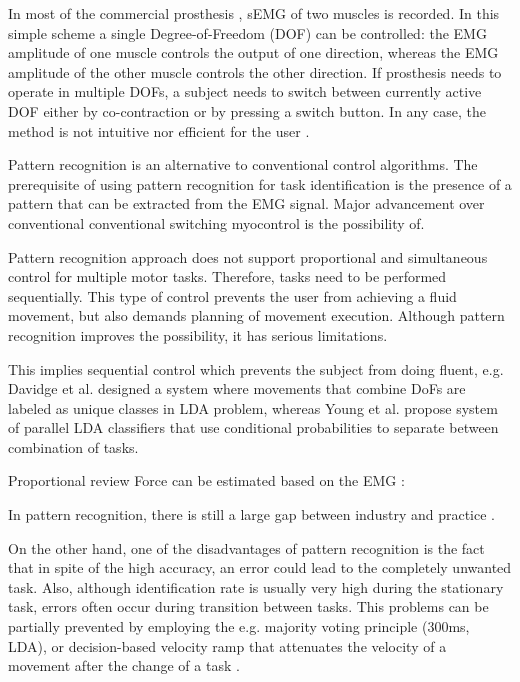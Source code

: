 In most of the commercial prosthesis \citep{Parker1986}, sEMG of two muscles is recorded. In this simple scheme a single Degree-of-Freedom (DOF) can be controlled: the EMG amplitude of one muscle controls the output of one direction, whereas the EMG amplitude of the other muscle controls the other direction. If prosthesis needs to operate in multiple DOFs, a subject needs to switch between currently active DOF either by co-contraction or by pressing a switch button. In any case, the method is not intuitive nor efficient for the user \citep{Farina2014}.

Pattern recognition is an alternative to conventional control algorithms. The prerequisite of using pattern recognition for task identification is the presence of a pattern that can be extracted from the EMG signal. Major advancement over conventional conventional switching myocontrol is the possibility of.

Pattern recognition approach does not support proportional and simultaneous control for multiple motor tasks. Therefore, tasks need to be performed sequentially. This type of control prevents the user from achieving a fluid movement, but also demands planning of movement execution. Although pattern recognition improves the possibility, it has serious limitations. 

This implies sequential control which prevents the subject from doing fluent, e.g. Davidge et al. designed a system where movements that combine DoFs are labeled as unique classes in LDA problem, whereas Young et al. \citep{Young2013} propose system of parallel LDA classifiers that use conditional probabilities to separate between combination of tasks.

Proportional review \citep{Fougner2012}
Force can be estimated based on the EMG : \citep{Staudenmann2010}

In pattern recognition, there is still a large gap between industry and practice \citep{Jiang2012}.

On the other hand, one of the disadvantages of pattern recognition is the fact that in spite of the high accuracy, an error could lead to the completely unwanted task. Also, although identification rate is usually very high during the stationary task, errors often occur during transition between tasks. This problems can be partially prevented by employing the e.g. majority voting principle \citep{Englehart2003} (300ms, LDA), or decision-based velocity ramp that attenuates the velocity of a movement after the change of a task \citep{Simon2011}. 

